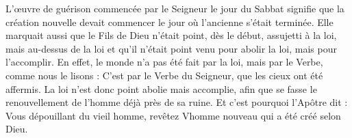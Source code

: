 L’œuvre de guérison commencée par le Seigneur le jour du Sabbat signifie que la création nouvelle devait commencer le jour où l'ancienne s’était terminée. Elle marquait aussi que le Fils de Dieu n’était point, dès le début, assujetti à la loi, mais au-dessus de la loi et qu’il n’était point venu pour abolir la loi, mais pour l’accomplir. En effet, le monde n’a pas été fait par la loi, mais par le Verbe, comme nous le lisons : C’est par le Verbe du Seigneur, que les cieux ont été affermis. La loi n’est donc point abolie mais accomplie, afin que se fasse le renouvellement de l’homme déjà près de sa ruine. Et c’est pourquoi l’Apôtre dit : Vous dépouillant du vieil homme, revêtez Vhomme nouveau qui a été créé selon Dieu.
